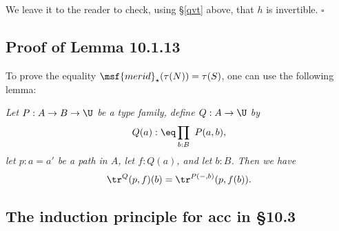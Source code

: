 \documentclass[12pt]{article}
\begin{document}
We leave it to the reader to check, using \S\ref{qvt} above, that $h$ is invertible. $\square$

\begin{comment}

This is about the sentence ``The obvious candidate for the coequalizer of the kernel pair of $f:A\to B$ is the image of f, as defined in \S7.6'' a few paragraphs before Lemma 10.1.1. (It's clear from the context that $A$ and $B$ are sets.) Let's show that this obvious candidate is the good one. It suffices to prove the statement

Let $A$ and $B$ be sets, let $f:A\to B$ be a surjection, define the equivalence relation $\sim$ on $A$ by 
$$
a\sim a'\text{ if and only if }f(a)=f(a'),
$$
let $A/\!\!\sim$ be the quotient as defined at the beginning of \S6.10, and let $q:A\to A/\!\!\sim$ be the canonical projection. Then there is a map $g:B\to A/\!\!\sim$ such that $g\ci f=q$:
$$
\xymatrix{
&A\ar[dl]_f\ar[dr]^q\\
B\ar[rr]_g&&A/\!\!\sim.}
$$ 

Proof. Given $b:B$ we define the sets and maps 
$$
\xymatrix{
\fib_f(b)\ar[rr]^{\pr_1}\ar[d]_{\lv-\rv}\ar[dr]^{q_b}&&A\ar[d]^q\\ 
\lV\fib_f(b)\rV\ar[r]_h&\fib_f(b)/\!\!\sim_b\ar[r]_{\ \ k}&A/\!\!\sim}
$$ 
as follows: Let $\sim_b$ be the equivalence relation defined on $\fib_f(b)$ by the requirement that $x\sim_b y$ for all $x,y:\fib_f(b)$, and $q_b$ the canonical projection; and note that $q_b$ induces $h$ and that $q\ci\pr_1$ induces $k$. The above diagram having been constructed, we set $g(b):\eq k(h(x))$, with $x:\lV\fib_f(b)\rV$. The equality $g\ci f=q$ is easily checked. $\square$

\end{comment}


\subsection{Proof of Lemma 10.1.13}

To prove the equality $\msf{merid}_\star(\tau(N))=\tau(S)$, one can use the following lemma:

\emph{Let $P:A\to B\to\U$ be a type family, define $Q:A\to\U$ by 
$$
Q(a):\eq\prod_{b:B}\ P(a,b),
$$ 
let $p:a=a'$ be a path in $A$, let $f:Q(a)$, and let $b:B$. Then we have} 
$$
\tr^Q(p,f)(b)=\tr^{P(-,b)}(p,f(b)).
$$


\subsection{The induction principle for \textsf{acc} in \S10.3}
\end{document}
